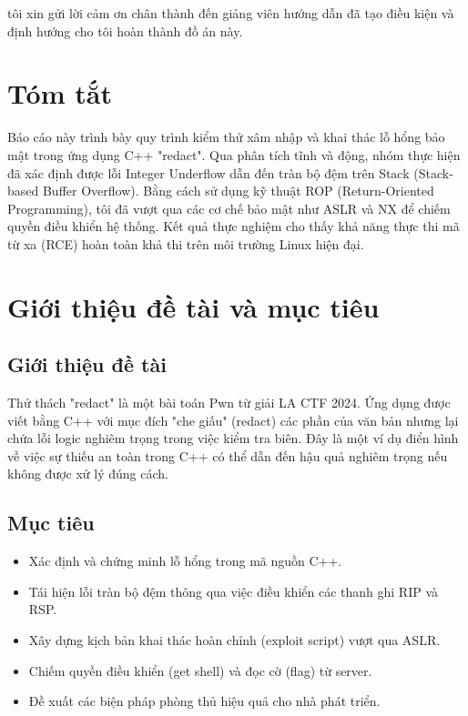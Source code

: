 \documentclass[12pt,a4paper]{report}
\begin{document}
tôi xin gửi lời cảm ơn chân thành đến giảng viên hướng dẫn đã tạo điều kiện và định hướng cho tôi hoàn thành đồ án này.

\tableofcontents

\chapter{Tóm tắt}

Báo cáo này trình bày quy trình kiểm thử xâm nhập và khai thác lỗ hổng bảo mật trong ứng dụng C++ "redact". Qua phân tích tĩnh và động, nhóm thực hiện đã xác định được lỗi Integer Underflow dẫn đến tràn bộ đệm trên Stack (Stack-based Buffer Overflow). Bằng cách sử dụng kỹ thuật ROP (Return-Oriented Programming), tôi đã vượt qua các cơ chế bảo mật như ASLR và NX để chiếm quyền điều khiển hệ thống. Kết quả thực nghiệm cho thấy khả năng thực thi mã từ xa (RCE) hoàn toàn khả thi trên môi trường Linux hiện đại.

\chapter{Giới thiệu đề tài và mục tiêu}
\section{Giới thiệu đề tài}
Thử thách "redact" là một bài toán Pwn từ giải LA CTF 2024. Ứng dụng được viết bằng C++ với mục đích "che giấu" (redact) các phần của văn bản nhưng lại chứa lỗi logic nghiêm trọng trong việc kiểm tra biên. Đây là một ví dụ điển hình về việc sự thiếu an toàn trong C++ có thể dẫn đến hậu quả nghiêm trọng nếu không được xử lý đúng cách.

\section{Mục tiêu}
\begin{itemize}
    \item Xác định và chứng minh lỗ hổng trong mã nguồn C++.
    \item Tái hiện lỗi tràn bộ đệm thông qua việc điều khiển các thanh ghi RIP và RSP.
    \item Xây dựng kịch bản khai thác hoàn chỉnh (exploit script) vượt qua ASLR.
    \item Chiếm quyền điều khiển (get shell) và đọc cờ (flag) từ server.
    \item Đề xuất các biện pháp phòng thủ hiệu quả cho nhà phát triển.
\end{itemize}
\end{document}
